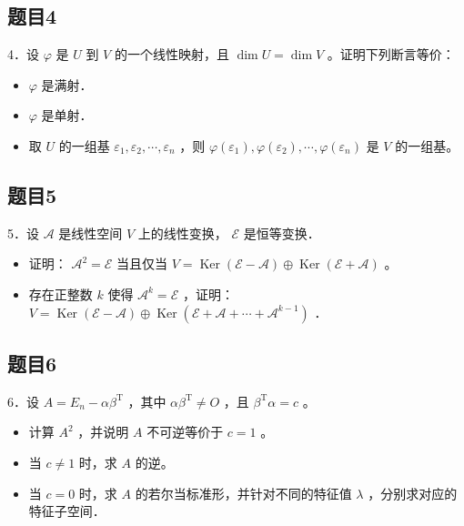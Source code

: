 \documentclass{article}
\begin{document}
\subsection{题目4}
4．设 \(\varphi\) 是 \(U\) 到 \(V\) 的一个线性映射，且 \(\operatorname{dim} U=\operatorname{dim} V\) 。证明下列断言等价：

\begin{itemize}
  \item[（1）] \(\varphi\) 是满射．
  \item[（2）] \(\varphi\) 是单射．
  \item[（3）] 取 \(U\) 的一组基 \(\varepsilon_{1}, \varepsilon_{2}, \cdots, \varepsilon_{n}\) ，则 \(\varphi\left(\varepsilon_{1}\right), \varphi\left(\varepsilon_{2}\right), \cdots, \varphi\left(\varepsilon_{n}\right)\) 是 \(V\) 的一组基。
\end{itemize}

\subsection{题目5}
5．设 \(\mathcal{A}\) 是线性空间 \(V\) 上的线性变换， \(\mathcal{E}\) 是恒等变换．

\begin{itemize}
  \item[（1）] 证明： \(\mathcal{A}^{2}=\mathcal{E}\) 当且仅当 \(V=\operatorname{Ker}(\mathcal{E}-\mathcal{A}) \oplus \operatorname{Ker}(\mathcal{E}+\mathcal{A})\) 。
  \item[（2）] 存在正整数 \(k\) 使得 \(\mathcal{A}^{k}=\mathcal{E}\) ，证明：\(V=\operatorname{Ker}(\mathcal{E}-\mathcal{A}) \oplus \operatorname{Ker}\left(\mathcal{E}+\mathcal{A}+\cdots+\mathcal{A}^{k-1}\right)\) ．
\end{itemize}

\subsection{题目6}
6．设 \(A=E_{n}-\alpha \beta^{\mathrm{T}}\) ，其中 \(\alpha \beta^{\mathrm{T}} \neq O\) ，且 \(\beta^{\mathrm{T}} \alpha=c\) 。

\begin{itemize}
  \item[（1）] 计算 \(A^{2}\) ，并说明 \(A\) 不可逆等价于 \(c=1\) 。
  \item[（2）] 当 \(c \neq 1\) 时，求 \(A\) 的逆。
  \item[（3）] 当 \(c=0\) 时，求 \(A\) 的若尔当标准形，并针对不同的特征值 \(\lambda\) ，分别求对应的特征子空间．
\end{itemize}
\end{document}
